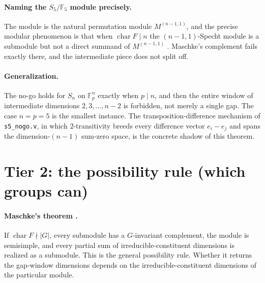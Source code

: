 \documentclass[11pt]{article}
\newcommand{\GF}[1]{\mathbb{F}_{#1}}
\newcommand{\Sym}{S}
\begin{document}
\paragraph{Naming the $\Sym_5/\GF{5}$ module precisely.}
The module is the natural permutation module $M^{(n-1,1)}$, and the precise modular
phenomenon is that when $\operatorname{char} F \mid n$ the $(n-1,1)$-Specht module is a
submodule but not a direct summand of $M^{(n-1,1)}$ \cite{tomczak-symnotes}. Maschke's
complement fails exactly there, and the intermediate piece does not split off.

\paragraph{Generalization.}
The no-go holds for $\Sym_n$ on $\GF{p}^n$ exactly when $p \mid n$, and then the entire
window of intermediate dimensions $2, 3, \dots, n-2$ is forbidden, not merely a single
gap. The case $n = p = 5$ is the smallest instance. The transposition-difference mechanism
of \texttt{s5\_nogo.v}, in which $2$-transitivity breeds every difference vector
$e_i - e_j$ and spans the dimension-$(n-1)$ sum-zero space, is the concrete shadow of this
theorem.

\section{Tier 2: the possibility rule (which groups can)}

\paragraph{Maschke's theorem \cite{tomczak-symnotes}.}
If $\operatorname{char} F \nmid |G|$, every submodule has a $G$-invariant complement, the
module is semisimple, and every partial sum of irreducible-constituent dimensions is
realized as a submodule. This is the general possibility rule. Whether it returns the
gap-window dimensions depends on the irreducible-constituent dimensions of the particular
module.
\end{document}
